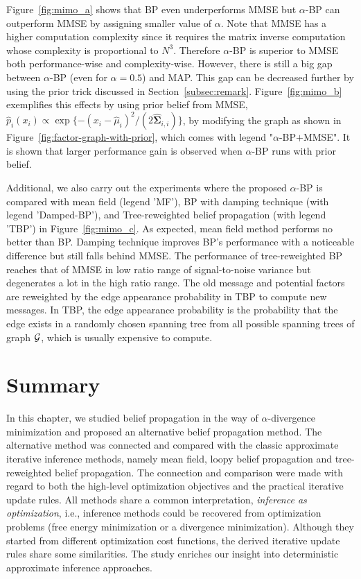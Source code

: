 Figure~\ref{fig:mimo_a} shows that BP even underperforms MMSE but $\alpha$-BP can outperform MMSE by assigning smaller value of $\alpha$.
Note that MMSE has a higher computation complexity since it requires the matrix inverse computation whose complexity is proportional to $N^3$. Therefore $\alpha$-BP is superior to MMSE both performance-wise and complexity-wise.  
However, there is still a big gap between $\alpha$-BP (even for $\alpha=0.5$) and MAP. This gap can be decreased further by using the prior trick discussed in Section~\ref{subsec:remark}. Figure~\ref{fig:mimo_b} exemplifies this effects by using prior belief from MMSE, $\hat{p}_i(x_i)\propto \exp\{-(x_i-\hat{\mu}_i)^2/(2\hat{\bm{\Sigma}}_{i,i})\}$, by modifying the graph as shown in Figure~\ref{fig:factor-graph-with-prior}, which comes with legend "$\alpha$-BP$+$MMSE". It is shown that larger performance gain is observed when $\alpha$-BP runs with prior belief.

Additional, we also carry out the experiments where the proposed $\alpha$-BP is compared with mean field (legend 'MF'), BP with damping technique \cite{Pretti2005damping} (with legend 'Damped-BP'), and Tree-reweighted belief propagation \cite{wainwright2008graphical} (with legend 'TBP') in Figure~\ref{fig:mimo_c}. As expected, mean field method performs no better than BP. Damping technique improves BP's performance with a noticeable difference but still falls behind MMSE. The performance of tree-reweighted BP reaches that of MMSE in low ratio range of signal-to-noise variance but degenerates a lot in the high ratio range. The old message and potential factors are reweighted by the edge appearance probability in TBP to compute new messages. In TBP, the edge appearance probability is the probability that the edge exists in a randomly chosen spanning tree from all possible spanning trees of graph $\mathcal{G}$, which is usually expensive to compute.

\section{Summary}

In this chapter, we studied belief propagation in the way of $\alpha$-divergence minimization and proposed an alternative belief propagation method. The alternative method was connected and compared with the classic approximate iterative inference methods, namely mean field, loopy belief propagation and tree-reweighted belief propagation. The connection and comparison were made with regard to both the high-level optimization objectives and the practical iterative update rules. All methods share a common interpretation, \textit{inference as optimization}, i.e., inference methods could be recovered from  optimization problems (free energy minimization or a divergence minimization). Although they started from different optimization cost functions, the derived iterative update rules share some similarities. The study enriches our insight into deterministic approximate inference approaches.

